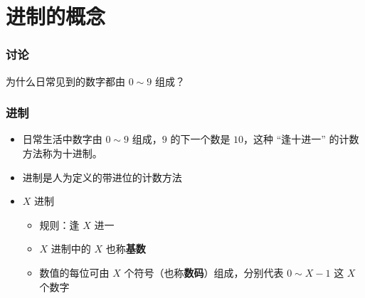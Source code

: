 \section{进制的概念}

\begin{frame}[fragile]
    \frametitle{讨论}

    \begin{block}{}
        \vspace{.5cm}
        \begin{center}
            {\Large 为什么日常见到的数字都由 $0 \sim 9$ 组成？}
        \end{center}
        \vspace{.5cm}
    \end{block}
\end{frame}

\begin{frame}[fragile]
    \frametitle{进制}

    \begin{itemize}[<+->]
        \item 日常生活中数字由 $0 \sim 9$ 组成，$9$ 的下一个数是 $10$，这种 “逢十进一” 的计数方法称为十进制。
        \item 进制是人为定义的带进位的计数方法
        \item $X$ 进制
        \begin{itemize}
           \item 规则：逢 $X$ 进一
           \item $X$ 进制中的 $X$ 也称\textbf{基数}
           \item 数值的每位可由 $X$ 个符号（也称\textbf{数码}）组成，分别代表 $0 \sim X-1$ 这 $X$ 个数字
        \end{itemize}
    \end{itemize}

\end{frame}

